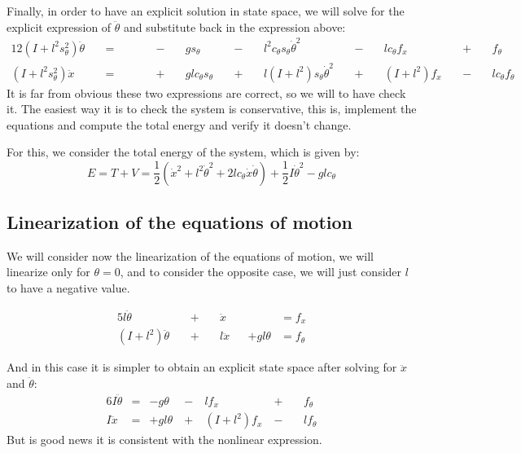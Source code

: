 Finally, in order to have an explicit solution in state space, we will solve for the explicit expression of $\ddot{\theta}$ and substitute back in the expression above:
\begin{alignat}{12}
	(I+l^2 s_\theta^2) \ddot{\theta}  && \ = \ &&  && \ - \ &&g  s_\theta  && \ - \ && l^2  c_\theta s_\theta \dot{\theta}^2  && \ - \ &&  l c_\theta f_x && \ + \ && f_\theta&&  \\
	(I+l^2 s_\theta^2) \ddot{x}       && \ = \ &&  && \ + \ && gl c_\theta s_\theta && \ + \ &&l (I+l^2) s_\theta \dot{\theta}^2      && \ + \ && (I+l^2) f_x     && \ - \ && l c_\theta f_\theta&&
\end{alignat}
It is far from obvious these two expressions are correct, so we will to have check it. The easiest way it is to check the system is conservative, this is, implement the equations and compute the total energy and verify it doesn't change.

For this, we consider the total energy of the system, which is given by:
\begin{equation}
	E = T + V = \frac{1}{2} \left(\dot{x}^2 + l^2 \dot{\theta}^2 + 2 l c_\theta  \dot{x} \dot{\theta} \right) + \frac{1}{2}I\dot{\theta}^2 - g l c_\theta
\end{equation}

\subsection{Linearization of the equations of motion}
We will consider now the linearization of the equations of motion, we will linearize only for $\theta=0$, and to consider the opposite case, we will just consider $l$ to have a negative value.

\begin{alignat}{5}
	l \ddot{\theta} && \ + \ && \ddot{x} && \ &= f_x \\
	\left(I+l^2\right) \ddot{\theta} && \ + \ && l \ddot{x} &&+ g l \theta &= f_\theta
\end{alignat}

And in this case it is simpler to obtain an explicit state space after solving for $\ddot{x}$ and $\ddot{\theta}$:
\begin{alignat}{6}
	I \ddot{\theta} &=& -g \theta & \ - \ & l f_x & \ + \ &&f_\theta \\
	I \ddot{x}      &=& +g l\theta & \ + \ & (I+l^2) f_x & \ - \ && l f_\theta
\end{alignat}
But is good news it is consistent with the nonlinear expression.